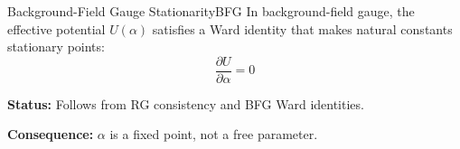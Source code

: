 \begin{axiom}{Background-Field Gauge Stationarity}{BFG}
In background-field gauge, the effective potential $U(\alpha)$ satisfies a 
Ward identity that makes natural constants stationary points:
\begin{equation}
    \frac{\partial U}{\partial \alpha} = 0
\end{equation}

\tcblower
\textbf{Status:} Follows from RG consistency and BFG Ward identities.

\textbf{Consequence:} $\alpha$ is a fixed point, not a free parameter.
\end{axiom}

